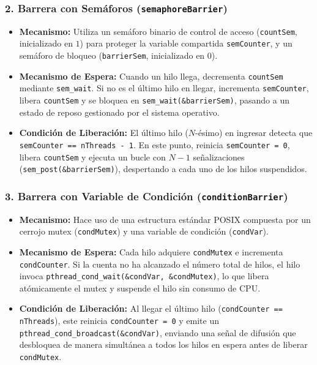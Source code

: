 \documentclass[11pt,a4paper]{article}
\begin{document}
\subsubsection{2. Barrera con Semáforos (\texttt{semaphoreBarrier})}
\begin{itemize}
    \item \textbf{Mecanismo:} Utiliza un semáforo binario de control de acceso (\texttt{countSem}, inicializado en $1$) para proteger la variable compartida \texttt{semCounter}, y un semáforo de bloqueo (\texttt{barrierSem}, inicializado en $0$).
    \item \textbf{Mecanismo de Espera:} Cuando un hilo llega, decrementa \texttt{countSem} mediante \texttt{sem\_wait}. Si no es el último hilo en llegar, incrementa \texttt{semCounter}, libera \texttt{countSem} y se bloquea en \texttt{sem\_wait(\&barrierSem)}, pasando a un estado de reposo gestionado por el sistema operativo.
    \item \textbf{Condición de Liberación:} El último hilo ($N$-ésimo) en ingresar detecta que \texttt{semCounter == nThreads - 1}. En este punto, reinicia \texttt{semCounter = 0}, libera \texttt{countSem} y ejecuta un bucle con $N - 1$ señalizaciones (\texttt{sem\_post(\&barrierSem)}), despertando a cada uno de los hilos suspendidos.
\end{itemize}

\subsubsection{3. Barrera con Variable de Condición (\texttt{conditionBarrier})}
\begin{itemize}
    \item \textbf{Mecanismo:} Hace uso de una estructura estándar POSIX compuesta por un cerrojo mutex (\texttt{condMutex}) y una variable de condición (\texttt{condVar}).
    \item \textbf{Mecanismo de Espera:} Cada hilo adquiere \texttt{condMutex} e incrementa \texttt{condCounter}. Si la cuenta no ha alcanzado el número total de hilos, el hilo invoca \texttt{pthread\_cond\_wait(\&condVar, \&condMutex)}, lo que libera atómicamente el mutex y suspende el hilo sin consumo de CPU.
    \item \textbf{Condición de Liberación:} Al llegar el último hilo (\texttt{condCounter == nThreads}), este reinicia \texttt{condCounter = 0} y emite un \texttt{pthread\_cond\_broadcast(\&condVar)}, enviando una señal de difusión que desbloquea de manera simultánea a todos los hilos en espera antes de liberar \texttt{condMutex}.
\end{itemize}
\end{document}

